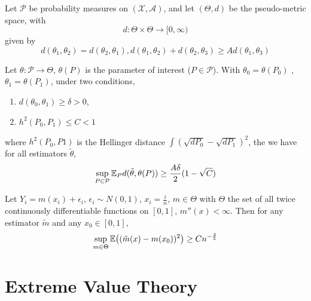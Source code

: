\begin{lem}
  Let $\mathcal{P}$ be probability measures on $(\mathcal{X}, \mathcal{A})$,
  and let $(\Theta, d)$ be the pseudo-metric space, with
  \begin{equation}
    \label{eq:108}
    d: \Theta \times \Theta \rightarrow [0, \infty)
  \end{equation} given by
  \begin{equation}
    \label{eq:109}
    d(\theta_{1}, \theta_{2}) = d(\theta_{2}, \theta_{1}),
    d(\theta_{1}, \theta_{2}) + d(\theta_{2}, \theta_{3}) \geq A
    d(\theta_{1}, \theta_{3})
  \end{equation}

  Let $\theta: \mathcal{P} \rightarrow \Theta$, $\theta(P)$ is the
  parameter of interest ($P \in \mathcal{P}$).  With $\theta_{0} =
  \theta(P_{0})$ , $\theta_{1} = \theta(P_{1})$, under two conditions,
  \begin{enumerate}
  \item $d(\theta_{0}, \theta_{1} ) \geq \delta > 0$,
  \item $h^{2}(P_{0}, P_{1}) \leq C < 1$
  \end{enumerate}
  where $h^{2}(P_{0}, P1)$ is the Hellinger distance $\int (\sqrt
  {dP_{0}} - \sqrt{dP_{1}})^{2}$,
  the we have for all estimators $\tilde \theta$,
  \begin{equation}
    \label{eq:110}
    \sup_{P \in \mathcal{P}} \E_{P} d(\tilde \theta, \theta(P)) \geq
    \frac{A \delta}{2}(1 - \sqrt{C})
  \end{equation}
\end{lem}

\begin{thm}
  \label{defn:minimax_lower_bounds:1}
  Let $Y_{i} = m(x_{i}) + \epsilon_{i}$, $\epsilon_{i} \sim N(0, 1)$,
  $x_{i} = \frac{i}{n}$, $m \in \Theta$ with $\Theta$ the set of all
  twice continuously differentiable functions on $[0, 1]$, $m''(x) <
  \infty$.
  Then for any estimator $\tilde m$ and any $x_{0} \in [0, 1]$,
  \begin{equation}
    \label{eq:115}
    \sup_{m \in \Theta} \E{(\tilde m(x) - m(x_{0}))^{2}} \geq C n^{-\frac{4}{5}}
  \end{equation}
\end{thm}

\section{Extreme Value Theory}
\label{sec:extreme-value-theory}

